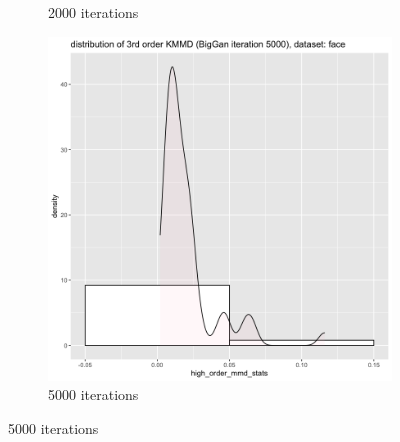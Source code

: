 \documentclass{article}
\begin{document}
\begin{figure}[h!]
\begin{subfigure}[b]{0.3\textwidth}
         \caption{2000 iterations}
     \end{subfigure}
     \hfill
     \begin{subfigure}[b]{0.3\textwidth}
         \centering
         \includegraphics[width=\textwidth]{kmmd_figures/biggan_face_highdist_5000.png}
         \caption{5000 iterations}
     \end{subfigure}
\end{figure}
\end{document}

